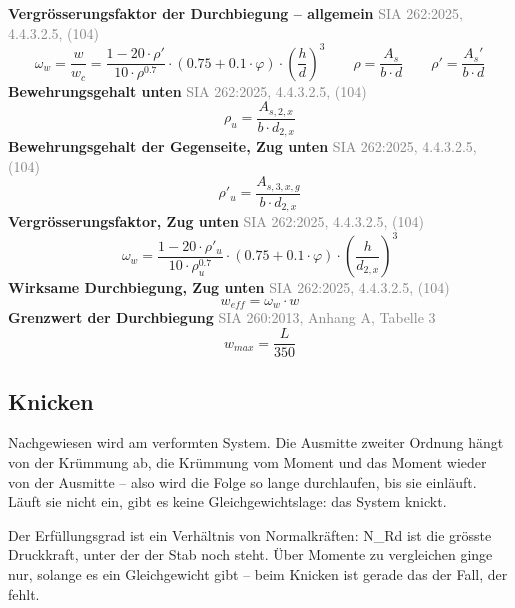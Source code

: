 \documentclass[11pt,a4paper]{article}
\newcommand{\normref}[1]{{\small\textcolor{gray}{#1}}}
\begin{document}
\noindent\textbf{Vergrösserungsfaktor der Durchbiegung – allgemein} \hfill \normref{SIA 262:2025, 4.4.3.2.5, (104)}
\begin{equation*}
\omega_w = \frac{w}{w_c} = \frac{1 - 20 \cdot \rho'}{10 \cdot \rho^{0.7}} \cdot \left(0.75 + 0.1 \cdot \varphi\right) \cdot \left(\frac{h}{d}\right)^{3} \qquad \rho = \frac{A_s}{b \cdot d} \qquad \rho' = \frac{A_s'}{b \cdot d}
\end{equation*}
\noindent\textbf{Bewehrungsgehalt unten} \hfill \normref{SIA 262:2025, 4.4.3.2.5, (104)}
\begin{equation*}
\rho_{u} = \frac{A_{s,2,x}}{b \cdot d_{2,x}}
\end{equation*}
\noindent\textbf{Bewehrungsgehalt der Gegenseite, Zug unten} \hfill \normref{SIA 262:2025, 4.4.3.2.5, (104)}
\begin{equation*}
\rho'_{u} = \frac{A_{s,3,x,g}}{b \cdot d_{2,x}}
\end{equation*}
\noindent\textbf{Vergrösserungsfaktor, Zug unten} \hfill \normref{SIA 262:2025, 4.4.3.2.5, (104)}
\begin{equation*}
\omega_w = \frac{1 - 20 \cdot \rho'_{u}}{10 \cdot \rho_{u}^{0.7}} \cdot \left(0.75 + 0.1 \cdot \varphi\right) \cdot \left(\frac{h}{d_{2,x}}\right)^{3}
\end{equation*}
\noindent\textbf{Wirksame Durchbiegung, Zug unten} \hfill \normref{SIA 262:2025, 4.4.3.2.5, (104)}
\begin{equation*}
w_{eff} = \omega_w \cdot w
\end{equation*}
\noindent\textbf{Grenzwert der Durchbiegung} \hfill \normref{SIA 260:2013, Anhang A, Tabelle 3}
\begin{equation*}
w_{max} = \frac{L}{350}
\end{equation*}
\subsection{Knicken}
Nachgewiesen wird am verformten System. Die Ausmitte zweiter Ordnung hängt von der Krümmung ab, die Krümmung vom Moment und das Moment wieder von der Ausmitte – also wird die Folge so lange durchlaufen, bis sie einläuft. Läuft sie nicht ein, gibt es keine Gleichgewichtslage: das System knickt.

Der Erfüllungsgrad ist ein Verhältnis von Normalkräften: N\_Rd ist die grösste Druckkraft, unter der der Stab noch steht. Über Momente zu vergleichen ginge nur, solange es ein Gleichgewicht gibt – beim Knicken ist gerade das der Fall, der fehlt.
\end{document}
